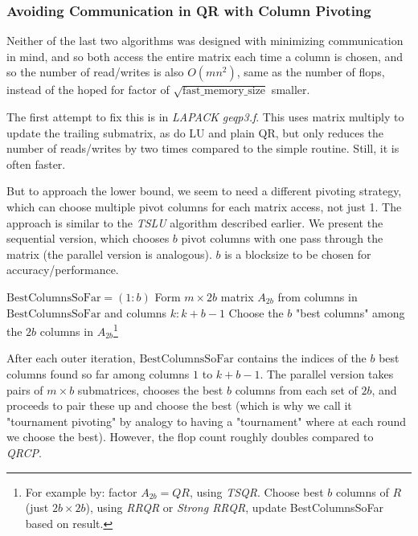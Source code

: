 \documentclass[11pt]{article}
\numberwithin{equation}{section}
\begin{document}
\subsubsection{Avoiding Communication in QR with Column Pivoting}
Neither of the last two algorithms was designed with minimizing communication in mind, 
and so both access the entire matrix each time a column is chosen, and so the number of read/writes is also $O(mn^2)$,
same as the number of flops, instead of the hoped for factor of $\sqrt{\mathrm{fast\_memory\_size}}$ smaller. 

The first attempt to fix this is in \textit{LAPACK} \textit{geqp3.f}. This uses matrix multiply to update the trailing submatrix, 
as do LU and plain QR, but only reduces the number of reads/writes by two times compared to the simple routine. Still, it is often faster.

But to approach the lower bound, we seem to need a different pivoting strategy, which can choose multiple pivot columns for each matrix access, not just 1.
The approach is similar to the \textit{TSLU} algorithm described earlier. We present the sequential version, 
which chooses $b$ pivot columns with one pass through the matrix (the parallel version is analogous). $b$ is a blocksize to be chosen for accuracy/performance.

\begin{savenotes}
    \begin{algorithmfrm}
        \begin{algorithmic}
            \State $\mathrm{BestColumnsSoFar}=(1:b)$
            \State Form $m \times 2b$ matrix $A_{2b}$ from columns in $\mathrm{BestColumnsSoFar}$ and columns $k:k+b-1$
            \State Choose the $b$ "best columns" among the $2b$ columns in $A_{2b}$\footnote{For example by: factor $A_{2b}=QR$, using \textit{TSQR}. Choose best $b$ columns of $R$ (just $2b \times 2b$), using \textit{RRQR} or \textit{Strong RRQR}, update BestColumnsSoFar based on result.}
            \EndFor
        \end{algorithmic}
    \end{algorithmfrm}
\end{savenotes}

After each outer iteration, $\mathrm{BestColumnsSoFar}$ contains the indices of the $b$ best columns found so far among columns $1$ to $k+b-1$. 
The parallel version takes pairs of $m \times b$ submatrices, chooses the best $b$ columns from each set of $2b$, 
and proceeds to pair these up and choose the best (which is why we call it "tournament pivoting" by analogy to having a "tournament" where at each round
we choose the best). However, the flop count roughly doubles compared to \textit{QRCP}.
\end{document}
